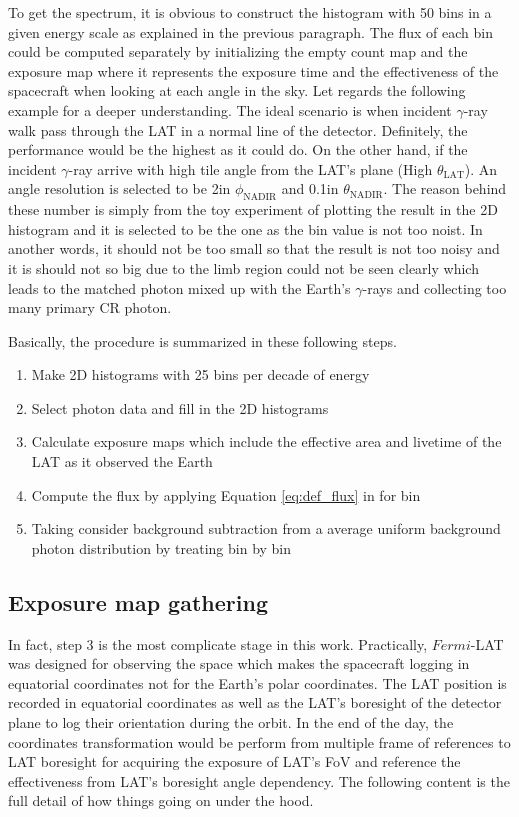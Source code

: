 To get the spectrum, it is obvious to construct the histogram 
with 50 bins in a given energy scale as explained in the previous paragraph.
The flux of each bin could be computed separately by initializing 
the empty count map and the exposure map where it represents the
exposure time and the effectiveness of the spacecraft when looking 
at each angle in the sky. Let regards the following example for 
a deeper understanding. The ideal scenario is when incident $\gamma$-ray
walk pass through the LAT in a normal line of the detector. 
Definitely, the performance would be the highest as it could do.
On the other hand, if the incident $\gamma$-ray arrive with high 
tile angle from the LAT's plane (High $\theta_\text{LAT}$).
An angle resolution is selected to be 2\textdegree in $\phi_\text{NADIR}$
and 0.1\textdegree in $\theta_\text{NADIR}$. The reason behind these 
number is simply from the toy experiment of plotting the result 
in the 2D histogram and it is selected to be the one as the bin value 
is not too noist. In another words, it should not be too small so that 
the result is not too noisy and it is should not so big due to the 
limb region could not be seen clearly which leads to the matched photon 
mixed up with the Earth's $\gamma$-rays and collecting too many primary 
CR photon.


Basically, the procedure is summarized in these following steps.
\begin{enumerate}
    \item Make 2D histograms with 25 bins per decade of energy
    \item Select photon data and fill in the 2D histograms
    \item Calculate exposure maps which include the effective area
    and livetime of the LAT as it observed the Earth    
    \item Compute the flux by applying Equation \ref{eq:def_flux} in for bin 
    \item Taking consider background subtraction from a average
    uniform background photon distribution by treating bin by bin 
\end{enumerate}


\subsection{Exposure map gathering}
In fact, step 3 is the most complicate stage in this work.
Practically, $Fermi$-LAT was designed for observing the space which
makes the spacecraft logging in equatorial coordinates not for the 
Earth's polar coordinates. The LAT position is recorded in 
equatorial coordinates as well as the LAT's boresight of the detector
plane to log their orientation during the orbit. In the end of the day,
the coordinates transformation would be perform from multiple frame 
of references to LAT boresight for acquiring the exposure of LAT's FoV
and reference the effectiveness from LAT's boresight angle dependency.
The following content is the full detail of how things going on 
under the hood.

